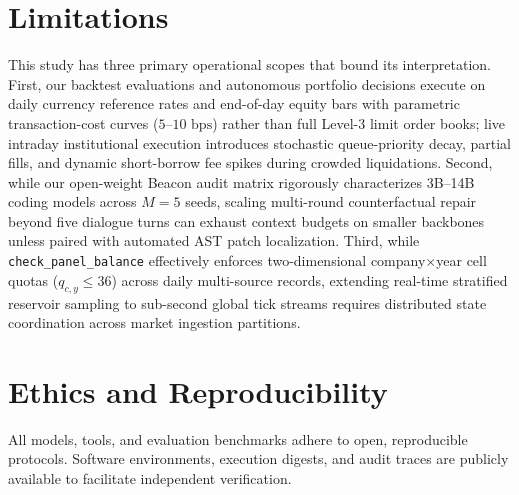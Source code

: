 \documentclass[11pt]{article}
\begin{document}
\section*{Limitations}
This study has three primary operational scopes that bound its interpretation. First, our
backtest evaluations and autonomous portfolio decisions execute on daily currency reference
rates and end-of-day equity bars with parametric transaction-cost curves ($5\text{--}10\text{ bps}$)
rather than full Level-3 limit order books; live intraday institutional execution introduces
stochastic queue-priority decay, partial fills, and dynamic short-borrow fee spikes during
crowded liquidations. Second, while our open-weight Beacon audit matrix rigorously characterizes
3B--14B coding models across $M=5$ seeds, scaling multi-round counterfactual repair beyond
five dialogue turns can exhaust context budgets on smaller backbones unless paired with
automated AST patch localization. Third, while \texttt{check\_panel\_balance} effectively enforces
two-dimensional company$\times$year cell quotas ($q_{c,y} \le 36$) across \PanelBalancedRows{}
daily multi-source records, extending real-time stratified reservoir sampling to sub-second
global tick streams requires distributed state coordination across market ingestion partitions.

\section*{Ethics and Reproducibility}
All models, tools, and evaluation benchmarks adhere to open, reproducible protocols.
Software environments, execution digests, and audit traces are publicly available to
facilitate independent verification.


\clearpage
\appendix
\raggedbottom
\makeatletter
\setlength{\@fptop}{0pt}
\setlength{\@fpsep}{14pt}
\setlength{\@fpbot}{0pt plus 1fil}
\makeatother

\clearpage

\end{document}
